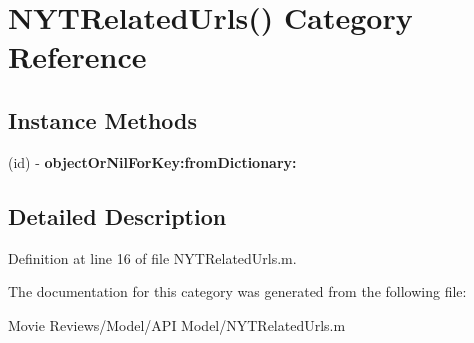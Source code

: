 \section{N\+Y\+T\+Related\+Urls() Category Reference}
\label{category_n_y_t_related_urls_07_08}
\subsection*{Instance Methods}
\begin{DoxyCompactItemize}
\item 
(id) -\/ {\bfseries object\+Or\+Nil\+For\+Key\+:from\+Dictionary\+:}\label{category_n_y_t_related_urls_07_08_a179f14c775962d0972ce6fed1b968606}

\end{DoxyCompactItemize}


\subsection{Detailed Description}


Definition at line 16 of file N\+Y\+T\+Related\+Urls.\+m.



The documentation for this category was generated from the following file\+:\begin{DoxyCompactItemize}
\item 
Movie Reviews/\+Model/\+A\+P\+I Model/N\+Y\+T\+Related\+Urls.\+m\end{DoxyCompactItemize}
